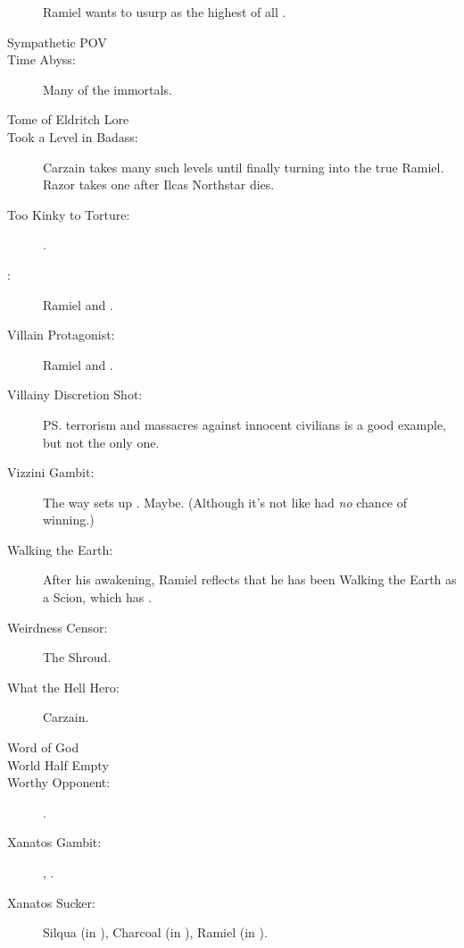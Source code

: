 \begin{flushleft}
\begin{description}
    Ramiel wants to usurp \Azraid{} as the highest of all \resphain. 
  \item[Sympathetic POV]
  \item[Time Abyss:] Many of the immortals. 
  \item[Tome of Eldritch Lore]
  \item[Took a Level in Badass:] 
    \subitem Carzain takes many such levels until finally turning into the true Ramiel. 
    \subitem Razor takes one after Ilcas Northstar dies.
  \item[Too Kinky to Torture:] \Nexagglachel.
  \item[\Ubermensch:] Ramiel and \Ishnaruchaefir.
  \item[Villain Protagonist:] Ramiel and \Ishnaruchaefir. 
  \item[Villainy Discretion Shot:] 
    \ps{\Ishnaruchaefir} terrorism and massacres against innocent civilians  is a good example, but not the only one. 
  \item[Vizzini Gambit:] 
    The way \Ishnaruchaefir{} sets up \Teshrial. 
    Maybe. 
    (Although it's not like \Teshrial{} had \emph{no} chance of winning.)
  \item[Walking the Earth:]
    After his awakening, Ramiel reflects that he has been Walking the Earth as a Scion, which has . 
  \item[Weirdness Censor:] The Shroud.
  \item[What the Hell Hero:] Carzain. 
  \item[Word of God]
  \item[World Half Empty] 
  \item[Worthy Opponent:] \Narkiza. 
  \item[Xanatos Gambit:] \Daggerrain, \Secherdamon. 
  \item[Xanatos Sucker:] 
    Silqua (in \SilquaBookEmph), 
    Charcoal (in \TwilightAngelRememberEmph), 
    Ramiel (in \SentinelsFinalBookEmph). 
\end{description}


\end{flushleft}
